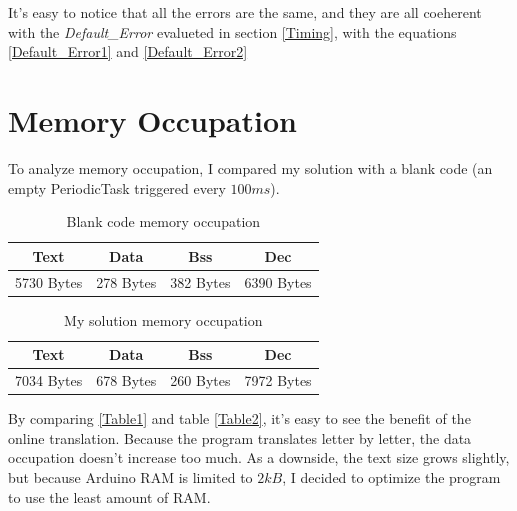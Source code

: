 \documentclass[a4paper]{article}
\begin{document}
It's easy to notice that all the errors are the same, and they are all coeherent with the \emph{Default\_Error} evalueted in section \ref{Timing}, with the equations \ref{Default_Error1} and \ref{Default_Error2}


\section{Memory Occupation}

To analyze memory occupation, I compared my solution with a blank code (an empty PeriodicTask triggered every \(100ms\)).

\begin{table}[h]
  \centering
  \begin{tabular}{|| c || c || c || c ||}
    \hline
    \textbf{Text} & \textbf{Data} & \textbf{Bss} & \textbf{Dec} \\
    \hline
    5730 Bytes    & 278 Bytes     & 382 Bytes    & 6390 Bytes   \\
    \hline
  \end{tabular}
  \caption{Blank code memory occupation}
  \label{Table1}
\end{table}


\begin{table}[h]
  \centering
  \begin{tabular}{|| c || c || c || c ||}
    \hline
    \textbf{Text} & \textbf{Data} & \textbf{Bss} & \textbf{Dec} \\
    \hline
    7034 Bytes    & 678 Bytes     & 260 Bytes    & 7972 Bytes   \\
    \hline
  \end{tabular}
  \caption{My solution memory occupation}
  \label{Table2}
\end{table}

By comparing \autoref{Table1} and table \autoref{Table2}, it's easy to see the benefit of the online translation. Because the program translates letter by letter, the data occupation doesn't increase too much. As a downside, the text size grows slightly, but because Arduino RAM is limited to  \(2kB\), I decided to optimize the program to use the least amount of RAM.
\end{document}
